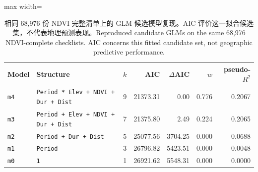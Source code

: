 \begin{table}[htbp]\centering\small
\caption{\ifzh 相同 68,976 份 NDVI 完整清单上的 GLM 候选模型复现。AIC 评价这一拟合候选集，不代表地理预测表现。\else Reproduced candidate GLMs on the same 68,976 NDVI-complete checklists. AIC concerns this fitted candidate set, not geographic predictive performance.\fi}\label{tab:glmsel}
\begin{adjustbox}{max width=\linewidth}
\begin{tabular}{lp{5.7cm}rrrrr}\toprule
Model & Structure & $k$ & AIC & $\Delta$AIC & $w$ & pseudo-$R^2$ \\ \midrule
\texttt{m4} & \scriptsize\texttt{Period * Elev + NDVI + Dur + Dist} & 9 & 21373.31 & 0.00 & 0.776 & 0.2067 \\
\texttt{m3} & \scriptsize\texttt{Period + Elev + NDVI + Dur + Dist} & 7 & 21375.80 & 2.49 & 0.224 & 0.2065 \\
\texttt{m2} & \scriptsize\texttt{Period + Dur + Dist} & 5 & 25077.56 & 3704.25 & 0.000 & 0.0688 \\
\texttt{m1} & \scriptsize\texttt{Period} & 3 & 26796.82 & 5423.51 & 0.000 & 0.0048 \\
\texttt{m0} & \scriptsize\texttt{1} & 1 & 26921.62 & 5548.31 & 0.000 & 0.0000 \\
\bottomrule\end{tabular}
\end{adjustbox}\end{table}